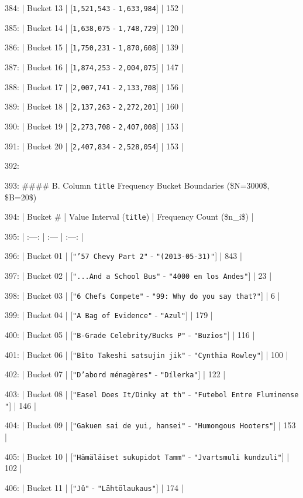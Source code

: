 \documentclass[11pt,a4paper]{article}
\begin{document}
384: | Bucket 13 | [\texttt{1,521,543} - \texttt{1,633,984}] | 152 |

385: | Bucket 14 | [\texttt{1,638,075} - \texttt{1,748,729}] | 120 |

386: | Bucket 15 | [\texttt{1,750,231} - \texttt{1,870,608}] | 139 |

387: | Bucket 16 | [\texttt{1,874,253} - \texttt{2,004,075}] | 147 |

388: | Bucket 17 | [\texttt{2,007,741} - \texttt{2,133,708}] | 156 |

389: | Bucket 18 | [\texttt{2,137,263} - \texttt{2,272,201}] | 160 |

390: | Bucket 19 | [\texttt{2,273,708} - \texttt{2,407,008}] | 153 |

391: | Bucket 20 | [\texttt{2,407,834} - \texttt{2,528,054}] | 153 |

392:

393: \#\#\#\# B. Column \texttt{title} Frequency Bucket Boundaries (\$N=3000\$, \$B=20\$)

394: | Bucket \# | Value Interval (\texttt{title}) | Frequency Count (\$n\_i\$) |

395: | :---: | :--- | :---: |

396: | Bucket 01 | [\texttt{"'57 Chevy Part 2"} - \texttt{"(2013-05-31)"}] | 843 |

397: | Bucket 02 | [\texttt{"...And a School Bus"} - \texttt{"4000 en los Andes"}] | 23 |

398: | Bucket 03 | [\texttt{"6 Chefs Compete"} - \texttt{"99: Why do you say that?"}] | 6 |

399: | Bucket 04 | [\texttt{"A Bag of Evidence"} - \texttt{"Azul"}] | 179 |

400: | Bucket 05 | [\texttt{"B-Grade Celebrity/Bucks P"} - \texttt{"Buzios"}] | 116 |

401: | Bucket 06 | [\texttt{"Bîto Takeshi satsujin jik"} - \texttt{"Cynthia Rowley"}] | 100 |

402: | Bucket 07 | [\texttt{"D'abord ménagères"} - \texttt{"Dílerka"}] | 122 |

403: | Bucket 08 | [\texttt{"Easel Does It/Dinky at th"} - \texttt{"Futebol Entre Fluminense "}] | 146 |

404: | Bucket 09 | [\texttt{"Gakuen sai de yui, hansei"} - \texttt{"Humongous Hooters"}] | 153 |

405: | Bucket 10 | [\texttt{"Hämäläiset sukupidot Tamm"} - \texttt{"Jvartsmuli kundzuli"}] | 102 |

406: | Bucket 11 | [\texttt{"Jû"} - \texttt{"Lähtölaukaus"}] | 174 |
\end{document}
